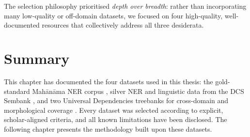 The selection philosophy prioritised \textit{depth over breadth}: rather than incorporating many low-quality or off-domain datasets, we focused on four high-quality, well-documented resources that collectively address all three desiderata.

\section{Summary}
\label{sec:summary}

This chapter has documented the four datasets used in this thesis: the gold-standard Mahānāma NER corpus \cite{sarkar2025mahanama}, silver NER and linguistic data from the DCS Sembank \cite{hellwig2025sembank, hellwig2010dcs}, and two Universal Dependencies treebanks for cross-domain and morphological coverage \cite{zeman2023ud, hellwig2020vedictreebank}. Every dataset was selected according to explicit, scholar-aligned criteria, and all known limitations have been disclosed. The following chapter presents the methodology built upon these datasets.

